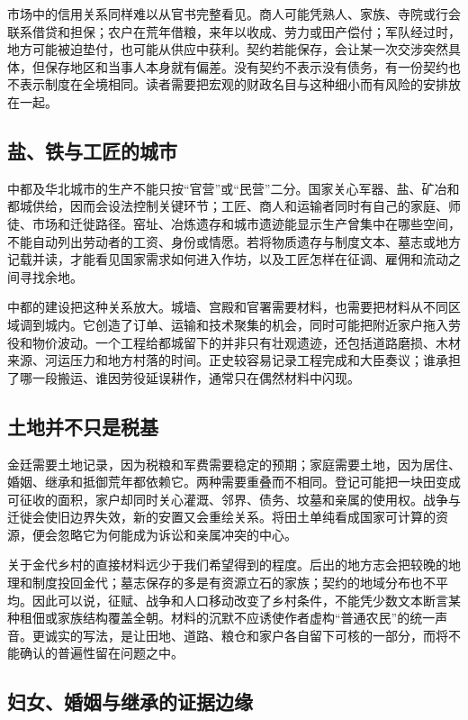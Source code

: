 市场中的信用关系同样难以从官书完整看见。商人可能凭熟人、家族、寺院或行会联系借贷和担保；农户在荒年借粮，来年以收成、劳力或田产偿付；军队经过时，地方可能被迫垫付，也可能从供应中获利。契约若能保存，会让某一次交涉突然具体，但保存地区和当事人本身就有偏差。没有契约不表示没有债务，有一份契约也不表示制度在全境相同。读者需要把宏观的财政名目与这种细小而有风险的安排放在一起。

\subsection{盐、铁与工匠的城市}

中都及华北城市的生产不能只按“官营”或“民营”二分。国家关心军器、盐、矿冶和都城供给，因而会设法控制关键环节；工匠、商人和运输者同时有自己的家庭、师徒、市场和迁徙路径。窑址、冶炼遗存和城市遗迹能显示生产曾集中在哪些空间，不能自动列出劳动者的工资、身份或情愿。若将物质遗存与制度文本、墓志或地方记载并读，才能看见国家需求如何进入作坊，以及工匠怎样在征调、雇佣和流动之间寻找余地。

中都的建设把这种关系放大。城墙、宫殿和官署需要材料，也需要把材料从不同区域调到城内。它创造了订单、运输和技术聚集的机会，同时可能把附近家户拖入劳役和物价波动。一个工程给都城留下的并非只有壮观遗迹，还包括道路磨损、木材来源、河运压力和地方村落的时间。正史较容易记录工程完成和大臣奏议；谁承担了哪一段搬运、谁因劳役延误耕作，通常只在偶然材料中闪现。

\subsection{土地并不只是税基}

金廷需要土地记录，因为税粮和军费需要稳定的预期；家庭需要土地，因为居住、婚姻、继承和抵御荒年都依赖它。两种需要重叠而不相同。登记可能把一块田变成可征收的面积，家户却同时关心灌溉、邻界、债务、坟墓和亲属的使用权。战争与迁徙会使旧边界失效，新的安置又会重绘关系。将田土单纯看成国家可计算的资源，便会忽略它为何能成为诉讼和亲属冲突的中心。

关于金代乡村的直接材料远少于我们希望得到的程度。后出的地方志会把较晚的地理和制度投回金代；墓志保存的多是有资源立石的家族；契约的地域分布也不平均。因此可以说，征赋、战争和人口移动改变了乡村条件，不能凭少数文本断言某种租佃或家族结构覆盖全朝。材料的沉默不应诱使作者虚构“普通农民”的统一声音。更诚实的写法，是让田地、道路、粮仓和家户各自留下可核的一部分，而将不能确认的普遍性留在问题之中。

\subsection{妇女、婚姻与继承的证据边缘}

